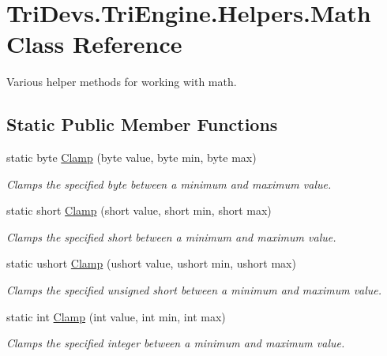 \hypertarget{class_tri_devs_1_1_tri_engine_1_1_helpers_1_1_math}{\section{Tri\-Devs.\-Tri\-Engine.\-Helpers.\-Math Class Reference}
\label{class_tri_devs_1_1_tri_engine_1_1_helpers_1_1_math}
}


Various helper methods for working with math.  


\subsection*{Static Public Member Functions}
\begin{DoxyCompactItemize}
\item 
static byte \hyperlink{class_tri_devs_1_1_tri_engine_1_1_helpers_1_1_math_a5f954ed1093b528f99105bd8a6118100}{Clamp} (byte value, byte min, byte max)
\begin{DoxyCompactList}\small\item\em Clamps the specified byte between a minimum and maximum value. \end{DoxyCompactList}\item 
static short \hyperlink{class_tri_devs_1_1_tri_engine_1_1_helpers_1_1_math_afe96bad9ca0c6f6666181b0967422fe0}{Clamp} (short value, short min, short max)
\begin{DoxyCompactList}\small\item\em Clamps the specified short between a minimum and maximum value. \end{DoxyCompactList}\item 
static ushort \hyperlink{class_tri_devs_1_1_tri_engine_1_1_helpers_1_1_math_a78d2b884ce34620f271ae846d6ff280b}{Clamp} (ushort value, ushort min, ushort max)
\begin{DoxyCompactList}\small\item\em Clamps the specified unsigned short between a minimum and maximum value. \end{DoxyCompactList}\item 
static int \hyperlink{class_tri_devs_1_1_tri_engine_1_1_helpers_1_1_math_a9c5e9c5176a465a9e76277b977f4917a}{Clamp} (int value, int min, int max)
\begin{DoxyCompactList}\small\item\em Clamps the specified integer between a minimum and maximum value. \end{DoxyCompactList}\item 

\end{DoxyCompactItemize}
